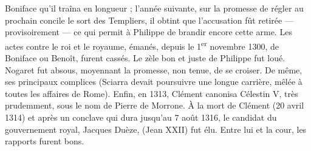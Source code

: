 \documentclass[french,twoside]{book} %
\begin{document}
\label{p53} Boniface qu’il traîna en longueur ; l’année suivante, sur la promesse de régler au prochain concile le sort des Templiers, il obtint que l’accusation fût retirée — provisoirement — ce qui permit à Philippe de brandir encore cette arme. Les actes contre le roi et le royaume, émanés, depuis le 1\textsuperscript{er} novembre 1300, de Boniface ou Benoît, furent cassés. Le zèle bon et juste de Philippe fut loué. Nogaret fut absous, moyennant la promesse, non tenue, de se croiser. De même, ses principaux complices (Sciarra devait poursuivre une longue carrière, mêlée à toutes les affaires de Rome). Enfin, en 1313, Clément canonisa Célestin V, très prudemment, sous le nom de Pierre de Morrone. À la mort de Clément (20 avril 1314) et après un conclave qui dura jusqu’au 7 août 1316, le candidat du gouvernement royal, Jacques Duèze, (Jean XXII) fut élu. Entre lui et la cour, les rapports furent bons.
\end{document}
